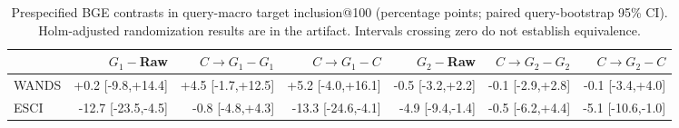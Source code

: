 \begin{table}[t]
\caption{Prespecified BGE contrasts in query-macro target inclusion@100 (percentage points; paired query-bootstrap 95\% CI). Holm-adjusted randomization results are in the artifact. Intervals crossing zero do not establish equivalence.}
\label{tab:optcontrasts}\centering\scriptsize
\begin{tabular}{lrrrrrr}\toprule
&$G_1-$Raw&$C\!\to\!G_1-G_1$&$C\!\to\!G_1-C$&$G_2-$Raw&$C\!\to\!G_2-G_2$&$C\!\to\!G_2-C$\\\midrule
WANDS & +0.2 [-9.8,+14.4] & +4.5 [-1.7,+12.5] & +5.2 [-4.0,+16.1] & -0.5 [-3.2,+2.2] & -0.1 [-2.9,+2.8] & -0.1 [-3.4,+4.0]\\
ESCI & -12.7 [-23.5,-4.5] & -0.8 [-4.8,+4.3] & -13.3 [-24.6,-4.1] & -4.9 [-9.4,-1.4] & -0.5 [-6.2,+4.4] & -5.1 [-10.6,-1.0]\\
\bottomrule\end{tabular}\end{table}
